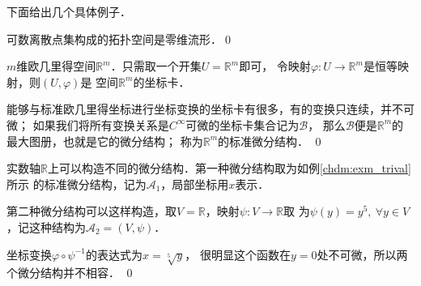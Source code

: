 下面给出几个具体例子．

\begin{example}
    可数离散点集构成的拓扑空间是零维流形．\qed
\end{example}


\begin{example}\label{chdm:exm_trival}
    $m$维欧几里得空间$\mathbb{R}^m$．只需取一个开集$U=\mathbb{R}^m$即可，
    令映射$\varphi:U\to \mathbb{R}^m$是恒等映射，则$(U,\varphi)$是
    空间$\mathbb{R}^m$的坐标卡．
    
    能够与标准欧几里得坐标进行坐标变换的坐标卡有很多，有的变换只连续，并不可微；    
    如果我们将所有变换关系是$C^\infty$可微的坐标卡集合记为$\mathscr{B}$，
    那么$\mathscr{B}$便是$\mathbb{R}^m$的最大图册，也就是它的{\kaishu 微分结构}；
    称为$\mathbb{R}^m$的{\kaishu 标准微分结构}． \qed
\end{example}


\begin{example}\label{chdm:exm_bu-tong-jie-gou}
    实数轴$\mathbb{R}$上可以构造不同的微分结构．第一种微分结构取为如例\ref{chdm:exm_trival}所示
    的标准微分结构，记为$\mathscr{A}_1$，局部坐标用$x$表示．
    
    第二种微分结构可以这样构造，取$V=\mathbb{R}$，映射$\psi:V\to \mathbb{R}$取
    为$\psi(y)=y^5, \  \forall y \in V$，记这种结构为$\mathscr{A}_2=(V,\psi)$．
    
    坐标变换$\varphi \circ \psi^{-1}$的表达式为$x=\sqrt[5]{y}$，
    很明显这个函数在$y=0$处不可微，所以两个微分结构并不相容． \qed
\end{example}

